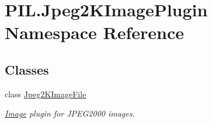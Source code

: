 \hypertarget{namespacePIL_1_1Jpeg2KImagePlugin}{}\section{P\+I\+L.\+Jpeg2\+K\+Image\+Plugin Namespace Reference}
\label{namespacePIL_1_1Jpeg2KImagePlugin}
\subsection*{Classes}
\begin{DoxyCompactItemize}
\item 
class \hyperlink{classPIL_1_1Jpeg2KImagePlugin_1_1Jpeg2KImageFile}{Jpeg2\+K\+Image\+File}
\begin{DoxyCompactList}\small\item\em \hyperlink{namespacePIL_1_1Image}{Image} plugin for J\+P\+E\+G2000 images. \end{DoxyCompactList}\end{DoxyCompactItemize}
